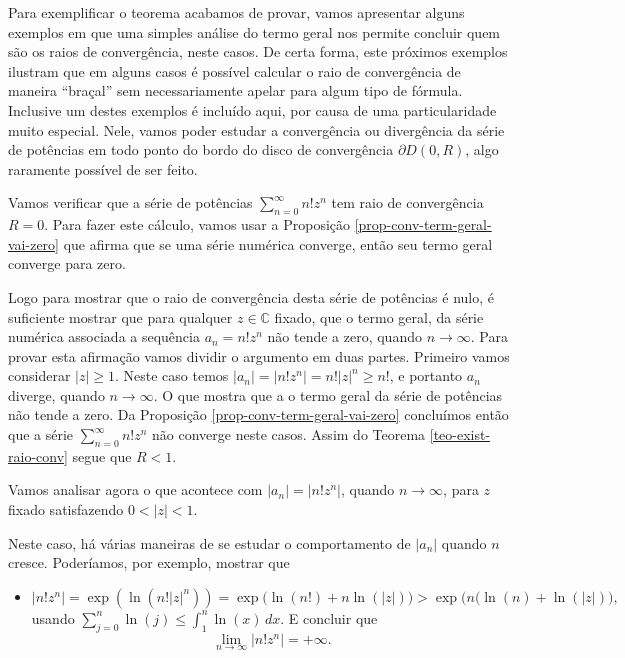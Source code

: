 \medskip 

Para exemplificar o teorema acabamos de provar, vamos apresentar
alguns exemplos em que uma simples análise do termo geral nos
permite concluir quem são os raios de convergência, neste casos.
De certa forma, este próximos exemplos ilustram que em alguns
casos é possível calcular o raio de convergência de maneira ``braçal''
sem necessariamente apelar para algum tipo de fórmula. 
Inclusive um destes exemplos é incluído aqui, 
por causa de uma particularidade muito especial. 
Nele, vamos poder estudar a convergência ou divergência da série 
de potências em todo ponto do bordo do disco de convergência 
$\partial D(0,R)$, algo raramente possível de ser feito.

\begin{exemplo}
Vamos verificar que a 
série de potências $\sum_{n=0}^{\infty}n!z^n$ tem raio de convergência $R=0$.
Para fazer este cálculo, vamos usar a Proposição \ref{prop-conv-term-geral-vai-zero}
que afirma que se uma série numérica converge, então seu termo geral converge para zero.

Logo para mostrar que o raio de convergência desta série de potências é nulo, 
é suficiente mostrar que para qualquer $z\in\mathbb{C}$ fixado, 
que o termo geral, da série numérica associada a sequência $a_n=n!z^n$ não tende a zero,
quando $n\to\infty$.
Para provar esta afirmação vamos dividir o argumento em duas partes. 
Primeiro vamos considerar $|z|\geqslant 1$. Neste caso temos 
$|a_n|=|n!z^n|= n!|z|^n\geqslant n!$, e portanto $a_n$ diverge, quando $n\to\infty$. 
O que mostra que a o termo geral da série de potências não tende a zero. 
Da Proposição \ref{prop-conv-term-geral-vai-zero} concluímos então que a série 
$\sum_{n=0}^{\infty}n!z^n$ não converge neste casos. Assim do
Teorema \ref{teo-exist-raio-conv} segue que $R<1$.

Vamos analisar agora o que acontece com $|a_n|=|n!z^n|$,
quando $n\to\infty$, para $z$ fixado satisfazendo $0<|z|<1$. 

\medskip 

Neste caso, há várias maneiras de se estudar o comportamento de $|a_n|$ quando $n$
cresce. Poderíamos, por exemplo, mostrar que
\begin{itemize}
	\item 
	$
	|n!z^n|=\exp( \ln(n!|z|^n) ) 
	= 
	\exp\big(\ln(n!)+n\ln(|z|) \big) 
	>
	\exp\big( n(\ln(n)+\ln(|z|) \big),
	$
	usando $\sum_{j=0}^n \ln(j) \leqslant \int_{1}^n \ln(x)\, dx$. E concluir que
	\[
	\lim_{n\to\infty}|n!z^n| = +\infty.
	\]
	

\end{itemize}
\end{exemplo}
